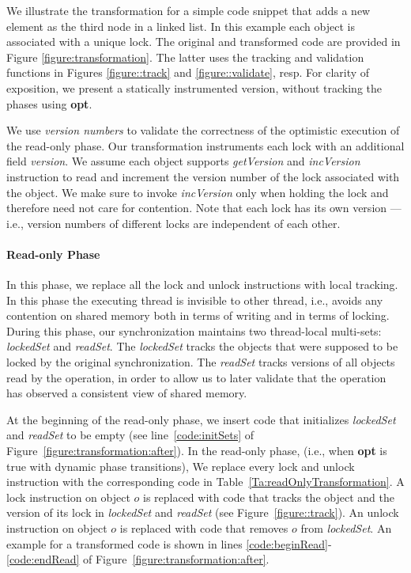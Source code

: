 We illustrate the transformation for a simple code snippet that adds a new element as the third node in a linked list. In this example each object is associated with a unique lock.
The original and transformed code are provided in Figure \ref{figure:transformation}. The latter uses
the tracking and validation functions in Figures \ref{figure::track} and
\ref{figure::validate}, resp.
For clarity of exposition, we present a statically instrumented version, without tracking the phases using \textbf{opt}.

We use \emph{version numbers} to validate the correctness of the optimistic execution of the read-only phase.
Our transformation instruments each lock with an additional field \emph{version}. We assume each object supports \emph{getVersion} and \emph{incVersion} instruction to read and increment the version number of the lock associated with the object. We make sure to invoke \emph{incVersion} only when holding the lock and therefore need not care for contention.
Note that each lock has its own version --- i.e., version numbers of different locks are independent of each other.

\paragraph{Read-only Phase}
In this phase, we replace all the lock and unlock instructions with local tracking.
In this phase the executing thread is invisible to other thread, i.e., 
 avoids any contention on shared memory both in terms of writing and in terms of locking.
During this phase, our synchronization maintains two thread-local multi-sets: \emph{lockedSet} and \emph{readSet}.
The \emph{lockedSet} tracks the objects that were supposed to be locked by the original synchronization.
%
The \emph{readSet} tracks versions of all objects read by the
operation, in order to allow us to later validate that the operation has observed a consistent view of shared memory.

At the beginning of the read-only phase, we insert code that initializes \emph{lockedSet} and \emph{readSet} to be empty (see  line~\ref{code:initSets} of Figure~\ref{figure:transformation:after}).
In the read-only phase, (i.e., when \textbf{opt} is true with dynamic phase transitions), 
We replace every lock and unlock instruction with the corresponding code in Table~\ref{Ta:readOnlyTransformation}.
A lock instruction on object $o$ is replaced with code that tracks the object and the version of its lock in
 \emph{lockedSet} and \emph{readSet} (see Figure~\ref{figure::track}).
An unlock instruction on object $o$ is replaced with code that removes $o$ from \emph{lockedSet}.
An example for a transformed code is shown in lines \ref{code:beginRead}-\ref{code:endRead} of Figure~\ref{figure:transformation:after}.

